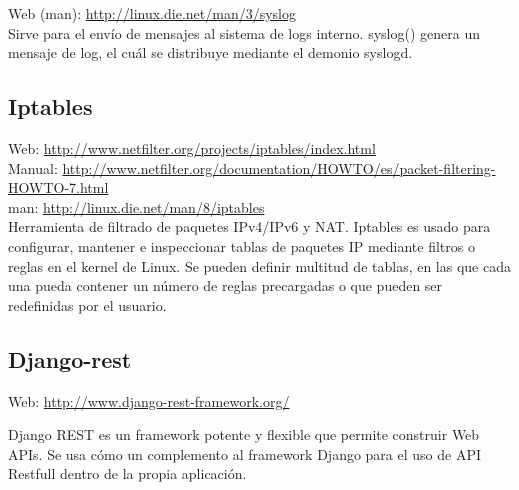 Web (man): \url{http://linux.die.net/man/3/syslog}\\

Sirve para el envío de mensajes al sistema de logs interno. syslog() genera un mensaje de log, el cuál se distribuye mediante el demonio syslogd.

\subsection{Iptables}

Web: \url{http://www.netfilter.org/projects/iptables/index.html}\\
Manual: \url{http://www.netfilter.org/documentation/HOWTO/es/packet-filtering-HOWTO-7.html}\\
man: \url{http://linux.die.net/man/8/iptables}\\

Herramienta de filtrado de paquetes IPv4/IPv6 y NAT. Iptables es usado para configurar, mantener e inspeccionar tablas de paquetes IP mediante filtros o reglas en el kernel de Linux. Se pueden definir multitud de tablas, en las que cada una pueda contener un número de reglas precargadas o que pueden ser redefinidas por el usuario. \\

\subsection{Django-rest}


Web: \url{http://www.django-rest-framework.org/}

Django REST es un framework potente y flexible que permite construir Web APIs. Se usa cómo un complemento al framework Django para el uso de API Restfull dentro de la propia aplicación.

